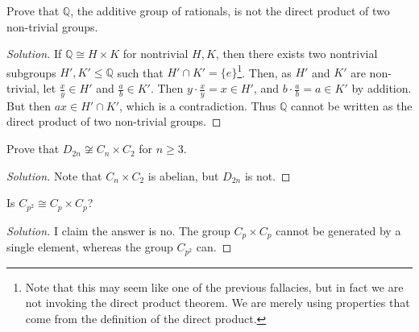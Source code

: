 \documentclass[11pt]{article}
\begin{document}
\begin{example}
	Prove that $\mathbb{Q}$, the additive group of rationals, is not the direct product of two non-trivial groups.
\end{example}
\begin{proof}[Solution]
	If $\mathbb{Q} \cong H \times K$ for nontrivial $H, K$, then there exists two nontrivial subgroups $H', K' \leq \mathbb{Q}$ such that $H' \cap K' = \{ e \}$\footnote{Note that this may seem like one of the previous fallacies, but in fact we are not invoking the direct product theorem. We are merely using properties that come from the definition of the direct product.}. Then, as $H'$ and $K'$ are non-trivial, let $\frac{x}{y} \in H'$ and $\frac{a}{b} \in K'$. Then $y \cdot \frac{x}{y} = x \in H'$, and $b \cdot \frac{a}{b} = a \in K'$ by addition. But then $ax \in H' \cap K'$, which is a contradiction. Thus $\mathbb{Q}$ cannot be written as the direct product of two non-trivial groups.
\end{proof}

\begin{example}
	Prove that $D_{2n} \not \cong C_n \times C_2$ for $n \geq 3$.
\end{example}
\begin{proof}[Solution]
	Note that $C_n \times C_2$ is abelian, but $D_{2n}$ is not.
\end{proof}

\begin{example}
	Is $C_{p^2} \cong C_p \times C_p$?
\end{example}
\begin{proof}[Solution]
	I claim the answer is no. 
	The group $C_p \times C_p$ cannot be generated by a single element, whereas the group $C_{p^2}$ can.
\end{proof}

\clearpage







\end{document}
